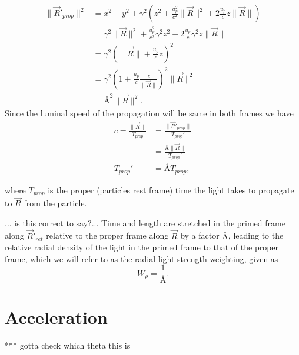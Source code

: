 \begin{equation}%
\label{eq: field displacement transform}
    \begin{aligned}
    \|\Vec{R}'_{prop}\|^2 &= x^2+y^2 + \gamma^2\left( z^2 +\frac{u_p^2}{c^2}\|\vec{R}\|^2 + 2 \frac{u_p}{c}z \|\vec{R}\| \right) \\
    &= \gamma^2 \|\vec{R}\|^2 + \frac{u_p^2}{c^2}\gamma^2z^2 + 2 \frac{u_p}{c}\gamma^2 z \|\vec{R}\| \\
    &= \gamma^2\left( \|\vec{R}\| + \frac{u_p}{c}z \right)^2\\
    &= \gamma^2\left( 1 + \frac{u_p}{c}\frac{z}{\|\vec{R}\|} \right)^2 \|\vec{R}\|^2 \\
    &= \text{\AA}^2 \|\vec{R}\|^2
    .
    \end{aligned}
\end{equation}%
Since the luminal speed of the propagation will be same in both frames we have
\begin{equation}%
\label{eq: retarded field displacement transform}
\begin{aligned}
   c = \frac{\|\Vec{R}\|}{T_{prop}} &= \frac{\|\Vec{R}'_{prop}\|}{T_{prop}'}\\
    &=  \frac{\text{\AA}\|\Vec{R}\|}{T_{prop}'} \\
    T_{prop}' &= \text{\AA} T_{prop},
\end{aligned}
\end{equation}%

where $T_{prop}$ is the proper (particles rest frame) time the light takes to propagate to $\vec{R}$ from the particle.

... is this correct to say?... Time and length are stretched in the primed frame along $\vec{R}'_{ret}$ relative to the proper frame along $\vec{R}$ by a factor $\text{\AA}$, leading to the relative radial density of the light in the primed frame to that of the proper frame, which we will refer to as the radial light strength weighting, given as
\begin{equation}%
\label{eq: radial weighting}
    W_\rho = \frac{1}{\text{\AA}}.
\end{equation}%

\section{Acceleration}
*** gotta check which theta  this is
